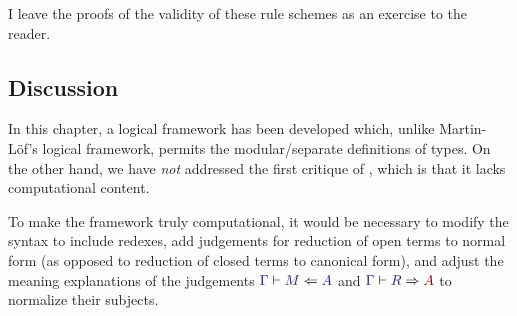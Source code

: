 \documentclass[main.tex]{subfiles}
\begin{document}
I leave the proofs of the validity of these rule schemes as an
exercise to the reader.

\subsection{Discussion} 

In this chapter, a logical framework has been developed which, unlike
Martin-L\"of's logical framework, permits the modular/separate
definitions of types. On the other hand, we have \emph{not} addressed
the first critique of \MLLF, which is that it lacks computational
content.

To make the framework truly computational, it would be necessary to
modify the syntax to include redexes, add judgements for reduction of
open terms to normal form (as opposed to reduction of closed terms to
canonical form), and adjust the meaning explanations of the judgements
$\lfsequent\Gamma\checks{M}{A}$ and $\lfsequent\Gamma\infers{R}{A}$ to
normalize their subjects.
\end{document}
